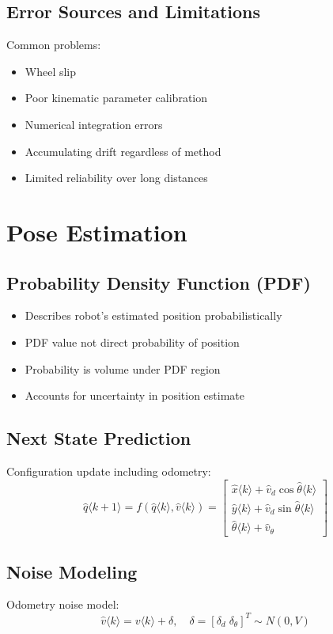 \documentclass[openany]{book}
\theoremstyle{definition}
\theoremstyle{remark}
\begin{document}
\subsection{Error Sources and Limitations}
Common problems:
\begin{itemize}
   \item Wheel slip
   \item Poor kinematic parameter calibration
   \item Numerical integration errors
   \item Accumulating drift regardless of method
   \item Limited reliability over long distances
\end{itemize}

\section{Pose Estimation}

\subsection{Probability Density Function (PDF)}
\begin{itemize}
   \item Describes robot's estimated position probabilistically
   \item PDF value not direct probability of position
   \item Probability is volume under PDF region
   \item Accounts for uncertainty in position estimate
\end{itemize}

\subsection{Next State Prediction}
Configuration update including odometry:
\begin{equation}
\hat{q}\langle k + 1\rangle = f(\hat{q}\langle k\rangle, \hat{v}\langle k\rangle) = 
\begin{bmatrix}
\hat{x}\langle k\rangle + \hat{v}_d \cos \hat{\theta}\langle k\rangle \\
\hat{y}\langle k\rangle + \hat{v}_d \sin \hat{\theta}\langle k\rangle \\
\hat{\theta}\langle k\rangle + \hat{v}_\theta
\end{bmatrix}
\end{equation}

\subsection{Noise Modeling}
Odometry noise model:
\begin{equation}
\hat{v}\langle k\rangle = v\langle k\rangle + \delta, \quad \delta = [\delta_d \; \delta_\theta]^T \sim N(0, V)
\end{equation}
\end{document}
